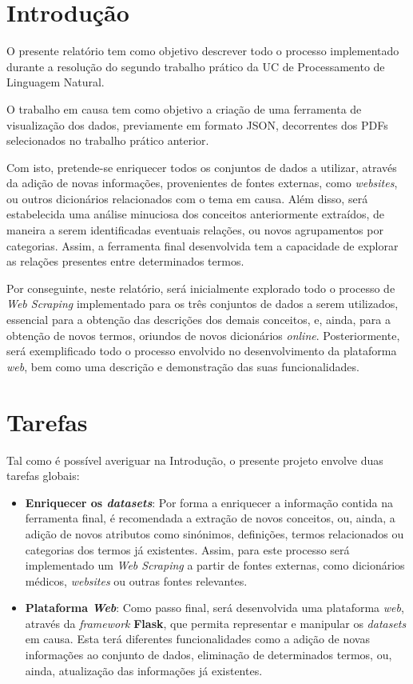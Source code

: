 

\section{Introdução}

O presente relatório tem como objetivo descrever todo o processo implementado durante a resolução do segundo trabalho prático da UC de Processamento de Linguagem Natural.

O trabalho em causa tem como objetivo a criação de uma ferramenta de visualização dos dados, previamente em formato JSON, decorrentes dos PDFs selecionados no trabalho prático anterior.

Com isto, pretende-se enriquecer todos os conjuntos de dados a utilizar, através da adição de novas informações, provenientes de fontes externas, como \textit{websites}, ou outros dicionários relacionados com o tema em causa. Além disso, será estabelecida uma análise minuciosa dos conceitos anteriormente extraídos, de maneira a serem identificadas eventuais relações, ou novos agrupamentos por categorias. Assim, a ferramenta final desenvolvida tem a capacidade de explorar as relações presentes entre determinados termos.


Por conseguinte, neste relatório, será inicialmente explorado todo o processo de \textit{Web Scraping} implementado para os três conjuntos de dados a serem utilizados, essencial para a obtenção das descrições dos demais conceitos, e, ainda, para a obtenção de novos termos, oriundos de novos dicionários \textit{online}.
Posteriormente, será exemplificado todo o processo envolvido no desenvolvimento da plataforma \textit{web}, bem como uma descrição e demonstração das suas funcionalidades.

\section{Tarefas}

Tal como é possível averiguar na Introdução, o presente projeto envolve duas tarefas globais:
\begin{itemize}
    \item \textbf{Enriquecer os \textit{datasets}}: Por forma a enriquecer a informação contida na ferramenta final, é recomendada a extração de novos conceitos, ou, ainda, a adição de novos atributos como sinónimos, definições, termos relacionados ou categorias dos termos já existentes. Assim, para este processo será implementado um \textit{Web Scraping} a partir de fontes externas, como dicionários médicos, \textit{websites} ou outras fontes relevantes.

    \item \textbf{Plataforma \textit{Web}}: Como passo final, será desenvolvida uma plataforma \textit{web}, através da \textit{framework} \textbf{Flask}, que permita representar e manipular os \textit{datasets} em causa. Esta terá diferentes funcionalidades como a adição de novas informações ao conjunto de dados, eliminação de determinados termos, ou, ainda, atualização das informações já existentes.
\end{itemize}

